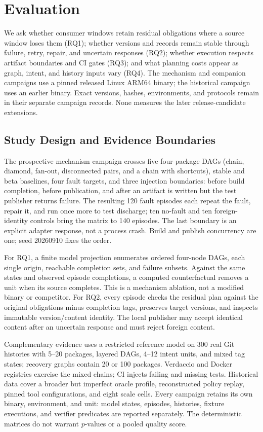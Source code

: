 \section{Evaluation}
\label{sec:eval}
We ask whether consumer windows retain residual obligations where a source
window loses them (RQ1); whether versions and records remain stable through
failure, retry, repair, and uncertain responses (RQ2); whether execution
respects artifact boundaries and CI gates (RQ3); and what planning costs appear
as graph, intent, and history inputs vary (RQ4).
The mechanism and companion campaigns use a pinned released Linux ARM64
binary; the historical campaign uses an earlier binary. Exact versions,
hashes, environments, and protocols remain in their separate campaign records.
None measures the later release-candidate extensions.

\subsection{Study Design and Evidence Boundaries}
\label{sec:eval:diff}
The prospective mechanism campaign crosses five four-package DAGs (chain,
diamond, fan-out, disconnected pairs, and a chain with shortcuts), stable and
beta baselines, four fault targets, and three injection boundaries: before
build completion, before publication, and after an artifact is written but the
test publisher returns failure. The resulting 120 fault episodes each repeat
the fault, repair it, and run once more to test discharge; ten no-fault and ten
foreign-identity controls bring the matrix to 140 episodes. The last boundary
is an explicit adapter response, not a process crash. Build and publish
concurrency are one; seed 20260910 fixes the order.

For RQ1, a finite model projection enumerates ordered four-node DAGs, each
single origin, reachable completion sets, and failure subsets. Against the same
states and observed episode completions, a computed counterfactual removes a
unit when its source completes. This is a mechanism ablation, not a modified
binary or competitor. For RQ2, every episode checks the residual plan against
the original obligations minus completion tags, preserves target versions,
and inspects immutable version/content identity. The local publisher may accept
identical content after an uncertain response and must reject foreign content.

Complementary evidence uses a restricted reference model on 300 real Git
histories with 5--20 packages, layered DAGs, 4--12 intent units, and mixed tag
states; recovery graphs contain 20 or 100 packages. Verdaccio and Docker
registries exercise the mixed chains; CI injects failing and missing tests.
Historical data cover a broader but imperfect oracle profile,
reconstructed policy replay, pinned tool configurations, and eight scale
cells. Every campaign retains its own binary, environment, and unit: model
states, episodes, histories, fixture executions, and verifier predicates are
reported separately. The deterministic matrices do not warrant $p$-values or
a pooled quality score.

